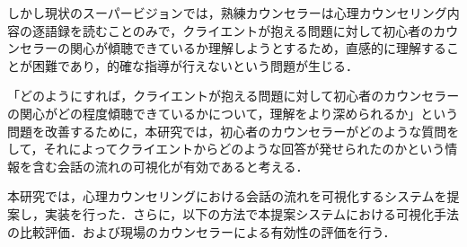 \documentclass[shuuron]{kuee}
\begin{document}

しかし現状のスーパービジョンでは，熟練カウンセラーは心理カウンセリング内容の逐語録を読むことのみで，クライエントが抱える問題に対して初心者のカウンセラーの関心が傾聴できているか理解しようとするため，直感的に理解することが困難であり，的確な指導が行えないという問題が生じる．








「どのようにすれば，クライエントが抱える問題に対して初心者のカウンセラーの関心がどの程度傾聴できているかについて，理解をより深められるか」という問題を改善するために，本研究では，初心者のカウンセラーがどのような質問をして，それによってクライエントからどのような回答が発せられたのかという情報を含む会話の流れの可視化が有効であると考える．%

本研究では，心理カウンセリングにおける会話の流れを可視化するシステムを提案し，実装を行った．さらに，以下の方法で本提案システムにおける可視化手法の比較評価．および現場のカウンセラーによる有効性の評価を行う．
\end{document}
